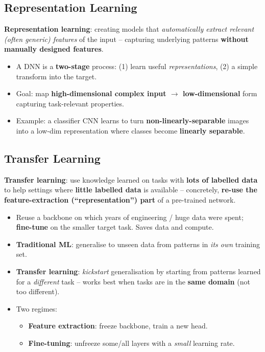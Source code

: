 \documentclass[10pt,a4paper]{article}
\begin{document}
	\subsection{Representation Learning}

	\begin{definitionbox}
		\textbf{Representation learning}: creating models that \emph{automatically extract relevant (often generic) features} of the input -- capturing underlying patterns \textbf{without manually designed features}.
	\end{definitionbox}

	\begin{itemize}[leftmargin=*]
		\item A DNN is a \textbf{two-stage} process: (1) learn useful \emph{representations}, (2) a simple transform into the target.
		\item Goal: map \textbf{high-dimensional complex input $\to$ low-dimensional} form capturing task-relevant properties.
		\item Example: a classifier CNN learns to turn \textbf{non-linearly-separable} images into a low-dim representation where classes become \textbf{linearly separable}.
	\end{itemize}

	\subsection{Transfer Learning}

	\begin{definitionbox}
		\textbf{Transfer learning}: use knowledge learned on tasks with \textbf{lots of labelled data} to help settings where \textbf{little labelled data} is available -- concretely, \textbf{re-use the feature-extraction (``representation'') part} of a pre-trained network.
	\end{definitionbox}

	\begin{itemize}[leftmargin=*]
		\item Reuse a backbone on which years of engineering / huge data were spent; \textbf{fine-tune} on the smaller target task. Saves data and compute.
		\item \textbf{Traditional ML}: generalise to unseen data from patterns in \emph{its own} training set.
		\item \textbf{Transfer learning}: \emph{kickstart} generalisation by starting from patterns learned for a \emph{different} task -- works best when tasks are in the \textbf{same domain} (not too different).
		\item Two regimes:
		\begin{itemize}
			\item \textbf{Feature extraction}: freeze backbone, train a new head.
			\item \textbf{Fine-tuning}: unfreeze some/all layers with a \emph{small} learning rate.
		\end{itemize}
	\end{itemize}
\end{document}
